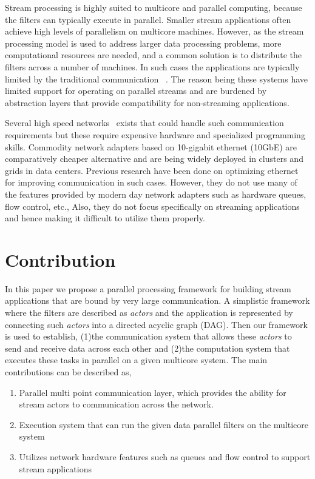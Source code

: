 \documentclass[10pt, conference, compsocconf, reqno]{IEEEtran}
\begin{document}
Stream processing is highly suited to multicore and parallel
computing, because the filters can typically execute in parallel.
Smaller stream applications often achieve high levels of parallelism
on multicore machines.  However, as the stream processing model
is used to address larger data processing problems, more computational
resources are needed, and a common solution is to distribute the
filters across a number of machines.
In such cases the applications are typically limited by the
traditional communication
~\cite{Wu:2007:PPB:1323954.1323957,Wu:2007:PAL:1227865.1228021,Dobrescu09routebricks:exploiting,Han:2010:PGS:1851275.1851207,Kohler2000}.
The reason being these systems have limited support for operating on
parallel streams and are burdened by abstraction layers that provide
compatibility for non-streaming applications.

Several high speed networks~\cite{fredj2011survey} exists that could handle such communication requirements but these require expensive hardware and specialized programming skills. Commodity network adapters based on 10-gigabit ethernet (10GbE) are comparatively cheaper alternative and are being widely deployed in clusters and grids in data centers. Previous research\cite{Romanow03anoverview,Feng:2003:OEN:1048935.1050200} have been done on optimizing ethernet for improving communication in such cases. However, they do not use many of the features provided by modern day network adapters such as hardware queues, flow control, etc., Also, they do not focus specifically on streaming applications and hence making it difficult to utilize them properly.

\section{Contribution}

In this paper we propose a parallel processing framework for building stream applications that are bound by very large communication. A simplistic framework where the filters are described as \textit{actors} and the application is represented by connecting such \textit{actors} into a directed acyclic graph (DAG). Then our framework is used to establish, (1)the communication system that allows these \textit{actors} to send and receive data across each other and (2)the computation system that executes these tasks in parallel on a given multicore system. The main contributions can be described as,

\begin{enumerate}
\item Parallel multi point communication layer, which provides the ability for stream actors to communication across the network.
\item Execution system that can run the given data parallel filters on the multicore system
\item Utilizes network hardware features such as queues and flow control to support stream applications

\end{enumerate}
\end{document}
